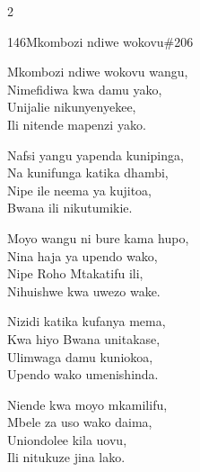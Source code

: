 \begin{multicols}{2}
\begin{hymn}{146}{Mkombozi ndiwe wokovu}{\#206}
\begin{stanza}
Mkombozi ndiwe wokovu wangu,\\
Nimefidiwa kwa damu yako,\\
Unijalie nikunyenyekee,\\
Ili nitende mapenzi yako.
\end{stanza}
\begin{stanza}
Nafsi yangu yapenda kunipinga,\\
Na kunifunga katika dhambi,\\
Nipe ile neema ya kujitoa,\\
Bwana ili nikutumikie.
\end{stanza}
\begin{stanza}
Moyo wangu ni bure kama hupo,\\
Nina haja ya upendo wako,\\
Nipe Roho Mtakatifu ili,\\
Nihuishwe kwa uwezo wake.
\end{stanza}
\begin{stanza}
Nizidi katika kufanya mema,\\
Kwa hiyo Bwana unitakase,\\
Ulimwaga damu kuniokoa,\\
Upendo wako umenishinda.
\end{stanza}
\begin{stanza}
Niende kwa moyo mkamilifu,\\
Mbele za uso wako daima,\\
Uniondolee kila uovu,\\
Ili nitukuze jina lako.
\end{stanza}
\end{hymn}


\end{multicols}
